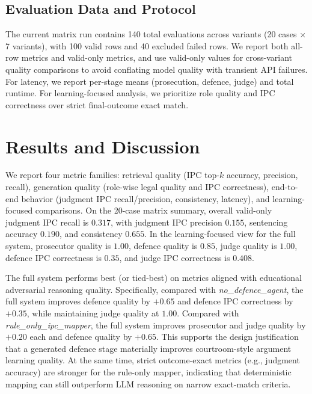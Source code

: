 \documentclass[conference]{IEEEtran}
\begin{document}
\subsection{Evaluation Data and Protocol}
The current matrix run contains 140 total evaluations across variants (20 cases $\times$ 7 variants), with 100 valid rows and 40 excluded failed rows. We report both all-row metrics and valid-only metrics, and use valid-only values for cross-variant quality comparisons to avoid conflating model quality with transient API failures. For latency, we report per-stage means (prosecution, defence, judge) and total runtime. For learning-focused analysis, we prioritize role quality and IPC correctness over strict final-outcome exact match.

\section{Results and Discussion}
We report four metric families: retrieval quality (IPC top-$k$ accuracy, precision, recall), generation quality (role-wise legal quality and IPC correctness), end-to-end behavior (judgment IPC recall/precision, consistency, latency), and learning-focused comparisons. On the 20-case matrix summary, overall valid-only judgment IPC recall is $0.317$, with judgment IPC precision $0.155$, sentencing accuracy $0.190$, and consistency $0.655$. In the learning-focused view for the full system, prosecutor quality is $1.00$, defence quality is $0.85$, judge quality is $1.00$, defence IPC correctness is $0.35$, and judge IPC correctness is $0.408$.

The full system performs best (or tied-best) on metrics aligned with educational adversarial reasoning quality. Specifically, compared with \textit{no\_defence\_agent}, the full system improves defence quality by $+0.65$ and defence IPC correctness by $+0.35$, while maintaining judge quality at $1.00$. Compared with \textit{rule\_only\_ipc\_mapper}, the full system improves prosecutor and judge quality by $+0.20$ each and defence quality by $+0.65$. This supports the design justification that a generated defence stage materially improves courtroom-style argument learning quality. At the same time, strict outcome-exact metrics (e.g., judgment accuracy) are stronger for the rule-only mapper, indicating that deterministic mapping can still outperform LLM reasoning on narrow exact-match criteria.
\end{document}
